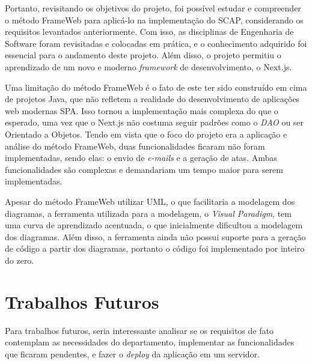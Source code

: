 Portanto, revisitando os objetivos do projeto, foi possível estudar e compreender o método FrameWeb para aplicá-lo na implementação do SCAP, considerando os requisitos levantados anteriormente.
Com isso, as disciplinas de Engenharia de Software foram revisitadas e colocadas em prática, e o conhecimento adquirido foi essencial para o andamento deste projeto.
Além disso, o projeto permitiu o aprendizado de um novo e moderno \textit{framework} de desenvolvimento, o Next.js.

Uma limitação do método FrameWeb é o fato de este ter sido construído em cima de projetos Java, que não refletem a realidade do desenvolvimento de aplicações web modernas
SPA. Isso tornou a implementação mais complexa do que o esperado, uma vez que o Next.js não costuma seguir padrões como o \textit{DAO} ou ser Orientado a Objetos.
Tendo em vista que o foco do projeto era a aplicação e análise do método FrameWeb, duas funcionalidades ficaram não foram implementadas,
sendo elas: o envio de \textit{e-mails} e a geração de atas. Ambas funcionalidades são complexas e demandariam um tempo maior para serem implementadas.

Apesar do método FrameWeb utilizar UML, o que facilitaria a modelagem dos diagramas, a ferramenta utilizada para a modelagem, o \textit{Visual Paradigm}, 
tem uma curva de aprendizado acentuada, o que inicialmente dificultou a modelagem dos diagramas. Além disso, a ferramenta ainda não possui suporte para a geração de código
a partir dos diagramas, portanto o código foi implementado por inteiro do zero.


\section{Trabalhos Futuros}
\label{sec-conclusoes-trabalhosfuturos}


Para trabalhos futuros, seria interessante analisar se os requisitos de fato contemplam as necessidades do departamento,
implementar as funcionalidades que ficaram pendentes, e fazer o \textit{deploy} da aplicação em um servidor.

